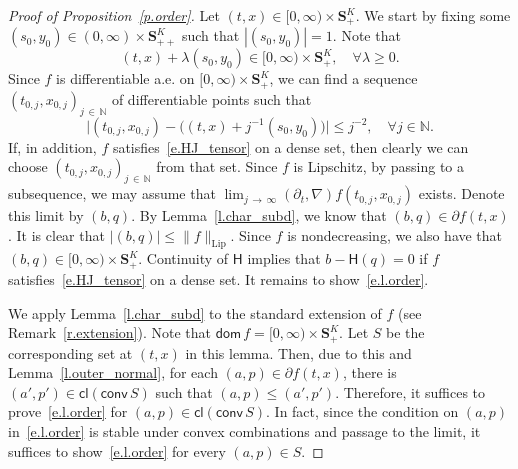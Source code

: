 \documentclass[AHL,Unicode,longabstracts,published]{cedram}
\newcommand{\N}{\mathbb{N}}
\renewcommand{\S}{\mathbf{S}}
\newcommand{\Lip}{\mathrm{Lip}}
\renewcommand{\H}{\mathsf{H}}
\newcommand{\dom}{\mathsf{dom}}
\newcommand{\cl}{\mathsf{cl}}
\newcommand{\conv}{\mathsf{conv}}
\renewcommand{\leq}{\leqslant}
\renewcommand{\geq}{\geqslant}
\let\oldforall\forall
\renewcommand*{\forall}{\mathrel{\oldforall}}
\begin{document}
\begin{proof}[Proof of Proposition~\ref{p.order}]
Let $(t,x)\in [0,\infty)\times \S^K_+$. We start by fixing some $(s_0,y_0)\in (0,\infty)\times \S^K_{++}$ such that $|(s_0,y_0)|=1$. Note that
\[
(t,x) +\lambda (s_0,y_0)\in [0,\infty)\times\S^K_+,\quad\forall \lambda \geq 0.
\]
Since $f$ is differentiable a.e. on $[0,\infty)\times \S^K_+$, we can find a sequence $(t_{0,j},x_{0,j})_{j\,\in\,\N}$ of differentiable points such that
\begin{equation}\label{e.t_0,j}
\big|\left(t_{0,j},x_{0,j}\right)-\big((t,x)+j^{-1}(s_0,y_0)\big)\big|\leq j^{-2},\quad\forall j\in\N.
\end{equation}
If, in addition, $f$ satisfies~\eqref{e.HJ_tensor} on a dense set, then clearly we can choose $(t_{0,j},x_{0,j})_{j\,\in\,\N}$ from that set. Since $f$ is Lipschitz, by passing to a subsequence, we may assume that $\lim_{j\,\to\,\infty}(\partial_t,\nabla)f(t_{0,j},x_{0,j})$ exists. Denote this limit by $(b,q)$. By Lemma~\ref{l.char_subd}, we know that $(b,q)\in\partial f(t,x)$. It is clear that $|(b,q)|\leq \|f\|_{\Lip}$. Since $f$ is nondecreasing, we also have that $(b,q)\in[0,\infty)\times \S^K_+$. Continuity of $\H$ implies that $b-\H(q)=0$ if $f$ satisfies~\eqref{e.HJ_tensor} on a dense set. It remains to show~\eqref{e.l.order}.



We apply Lemma~\ref{l.char_subd} to the standard extension of $f$ {(see Remark~\ref{r.extension})}. Note that $\dom\, f= [0,\infty)\times \S^K_+$. Let $S$ be the corresponding set at $(t,x)$ in this lemma. Then, due to this and Lemma~\ref{l.outer_normal}, for each $(a,p) \in \partial f(t,x)$, there is $(a',p')\in \cl(\conv\, S)$ such that $(a,p)\leq (a',p')$. Therefore, it suffices to prove~\eqref{e.l.order} for $(a,p)\in \cl(\conv\, S)$. In fact, since the condition on $(a,p)$ in~\eqref{e.l.order} is stable under convex combinations and passage to the limit, it suffices to show~\eqref{e.l.order} for every $(a,p) \in S$.


\end{proof}
\end{document}
